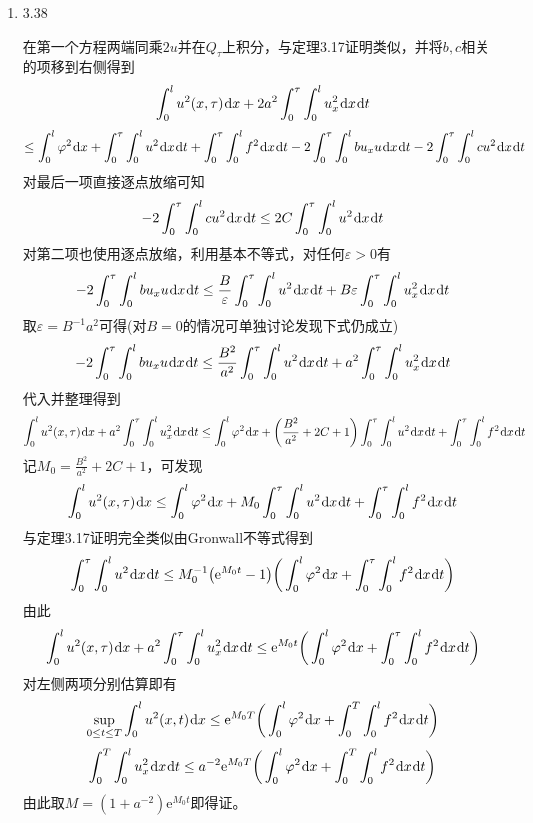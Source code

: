 \documentclass[a4paper,UTF8,fontset=windows,10pt]{ctexart}
\newcommand*{\dr}{\hspace{0.07em}\mathrm{d}}
\newcommand*{\er}{\mathrm{e}}
\begin{document}
\begin{enumerate}
    \item 3.38
    
    在第一个方程两端同乘$2u$并在$Q_\tau$上积分，与定理3.17证明类似，并将$b,c$相关的项移到右侧得到
    $$\int_0^lu^2(x,\tau)\dr x+2a^2\int_0^\tau\int_0^lu_x^2\dr x\dr t$$
    $$\le\int_0^l\varphi^2\dr x+\int_0^\tau\int_0^lu^2\dr x\dr t+\int_0^\tau\int_0^lf^2\dr x\dr t-2\int_0^\tau\int_0^lbu_xu\dr x\dr t-2\int_0^\tau\int_0^lcu^2\dr x\dr t$$
    对最后一项直接逐点放缩可知
    $$-2\int_0^\tau\int_0^lcu^2\dr x\dr t\le 2C\int_0^\tau\int_0^lu^2\dr x\dr t$$
    对第二项也使用逐点放缩，利用基本不等式，对任何$\varepsilon>0$有
    $$-2\int_0^\tau\int_0^lbu_xu\dr x\dr t\le\frac{B}{\varepsilon}\int_0^\tau\int_0^lu^2\dr x\dr t+B\varepsilon\int_0^\tau\int_0^lu_x^2\dr x\dr t$$
    取$\varepsilon=B^{-1}a^2$可得(对$B=0$的情况可单独讨论发现下式仍成立)
    $$-2\int_0^\tau\int_0^lbu_xu\dr x\dr t\le\frac{B^2}{a^2}\int_0^\tau\int_0^lu^2\dr x\dr t+a^2\int_0^\tau\int_0^lu_x^2\dr x\dr t$$
    代入并整理得到
    $$\int_0^lu^2(x,\tau)\dr x+a^2\int_0^\tau\int_0^lu_x^2\dr x\dr t\le\int_0^l\varphi^2\dr x+\bigg(\frac{B^2}{a^2}+2C+1\bigg)\int_0^\tau\int_0^lu^2\dr x\dr t+\int_0^\tau\int_0^lf^2\dr x\dr t$$
    记$M_0=\frac{B^2}{a^2}+2C+1$，可发现
    $$\int_0^lu^2(x,\tau)\dr x\le\int_0^l\varphi^2\dr x+M_0\int_0^\tau\int_0^lu^2\dr x\dr t+\int_0^\tau\int_0^lf^2\dr x\dr t$$
    与定理3.17证明完全类似由Gronwall不等式得到
    $$\int_0^\tau\int_0^lu^2\dr x\dr t\le M_0^{-1}\big(\er^{M_0t}-1\big)\bigg(\int_0^l\varphi^2\dr x+\int_0^\tau\int_0^lf^2\dr x\dr t\bigg)$$
    由此
    $$\int_0^lu^2(x,\tau)\dr x+a^2\int_0^\tau\int_0^lu_x^2\dr x\dr t\le\er^{M_0t}\bigg(\int_0^l\varphi^2\dr x+\int_0^\tau\int_0^lf^2\dr x\dr t\bigg)$$
    对左侧两项分别估算即有
    $$\sup_{0\le t\le T}\int_0^lu^2(x,t)\dr x\le\er^{M_0T}\bigg(\int_0^l\varphi^2\dr x+\int_0^T\int_0^lf^2\dr x\dr t\bigg)$$
    $$\int_0^T\int_0^lu_x^2\dr x\dr t\le a^{-2}\er^{M_0T}\bigg(\int_0^l\varphi^2\dr x+\int_0^T\int_0^lf^2\dr x\dr t\bigg)$$
    由此取$M=(1+a^{-2})\er^{M_0t}$即得证。
\end{enumerate}
\end{document}
